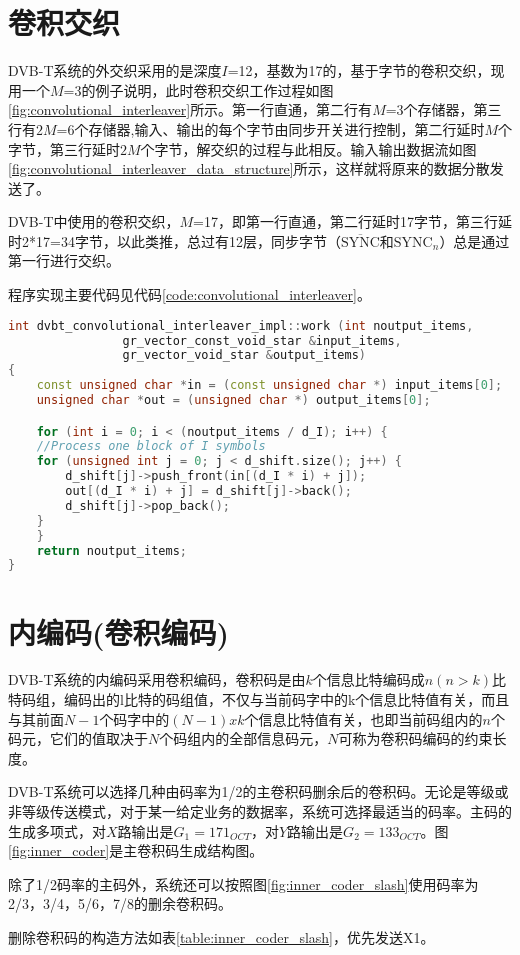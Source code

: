 	\section{卷积交织}
		\par DVB-T系统的外交织采用的是深度$I$=12，基数为17的，基于字节的卷积交织，现用一个$M$=3的例子说明，此时卷积交织工作过程如图\ref{fig:convolutional_interleaver}所示。第一行直通，第二行有$M$=3个存储器，第三行有$2M$=6个存储器,输入、输出的每个字节由同步开关进行控制，第二行延时$M$个字节，第三行延时$2M$个字节，解交织的过程与此相反。输入输出数据流如图\ref{fig:convolutional_interleaver_data_structure}所示\cite{用FPGA实现DVB标准中的卷积交织_刘静}，这样就将原来的数据分散发送了。
		
		
		\par DVB-T中使用的卷积交织，$M$=17，即第一行直通，第二行延时17字节，第三行延时2*17=34字节，以此类推，总过有12层，同步字节（$\overline{\text{SYNC}}$和$\text{SYNC}_n$）总是通过第一行进行交织。
		\par 程序实现主要代码见代码\ref{code:convolutional_interleaver}。
		\begin{lstlisting}[caption = {卷积交织},label = {code:convolutional_interleaver},language = C++ ]
int dvbt_convolutional_interleaver_impl::work (int noutput_items,
				gr_vector_const_void_star &input_items,
				gr_vector_void_star &output_items)
{
	const unsigned char *in = (const unsigned char *) input_items[0];
	unsigned char *out = (unsigned char *) output_items[0];

	for (int i = 0; i < (noutput_items / d_I); i++) {
	//Process one block of I symbols
	for (unsigned int j = 0; j < d_shift.size(); j++) {
		d_shift[j]->push_front(in[(d_I * i) + j]);
		out[(d_I * i) + j] = d_shift[j]->back();
		d_shift[j]->pop_back();
	}
	}
	return noutput_items;
}
		\end{lstlisting}
	\section{内编码(卷积编码)}
		\par DVB-T系统的内编码采用卷积编码，卷积码是由$k$个信息比特编码成$n(n>k)$比特码组，编码出的l比特的码组值，不仅与当前码字中的k个信息比特值有关，而且与其前面$N-1$个码字中的$(N-1)xk$个信息比特值有关，也即当前码组内的$n$个码元，它们的值取决于$N$个码组内的全部信息码元，$N$可称为卷积码编码的约束长度。
		\par DVB-T系统可以选择几种由码率为1/2的主卷积码删余后的卷积码。无论是等级或非等级传送模式，对于某一给定业务的数据率，系统可选择最适当的码率。主码的生成多项式，对$X$路输出是$G_1=171_{OCT}$，对$Y$路输出是$G_2=133_{OCT}$。图\ref{fig:inner_coder}是主卷积码生成结构图。
		
		\par 除了1/2码率的主码外，系统还可以按照图\ref{fig:inner_coder_slash}使用码率为2/3，3/4，5/6，7/8的删余卷积码。
		
		\par 删除卷积码的构造方法如表\ref{table:inner_coder_slash}，优先发送X1。
		
